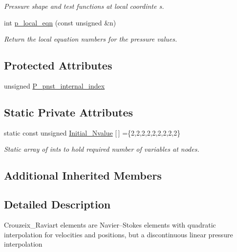 \begin{DoxyCompactItemize}
\begin{DoxyCompactList}\small\item\em Pressure shape and test functions at local coordinte s. \end{DoxyCompactList}\item 
int \hyperlink{classoomph_1_1PolarCrouzeixRaviartElement_a13dafb71fd6a720e02a6382b1a3274e7}{p\+\_\+local\+\_\+eqn} (const unsigned \&n)
\begin{DoxyCompactList}\small\item\em Return the local equation numbers for the pressure values. \end{DoxyCompactList}\end{DoxyCompactItemize}
\subsection*{Protected Attributes}
\begin{DoxyCompactItemize}
\item 
unsigned \hyperlink{classoomph_1_1PolarCrouzeixRaviartElement_a7d41e3c313c6f4dd798c2dd696ef22c8}{P\+\_\+pnst\+\_\+internal\+\_\+index}
\end{DoxyCompactItemize}
\subsection*{Static Private Attributes}
\begin{DoxyCompactItemize}
\item 
static const unsigned \hyperlink{classoomph_1_1PolarCrouzeixRaviartElement_aed13ef3c1adcea8f31184f91dedaff28}{Initial\+\_\+\+Nvalue} \mbox{[}$\,$\mbox{]} =\{2,2,2,2,2,2,2,2,2\}
\begin{DoxyCompactList}\small\item\em Static array of ints to hold required number of variables at nodes. \end{DoxyCompactList}\end{DoxyCompactItemize}
\subsection*{Additional Inherited Members}


\subsection{Detailed Description}
Crouzeix\+\_\+\+Raviart elements are Navier--Stokes elements with quadratic interpolation for velocities and positions, but a discontinuous linear pressure interpolation 

